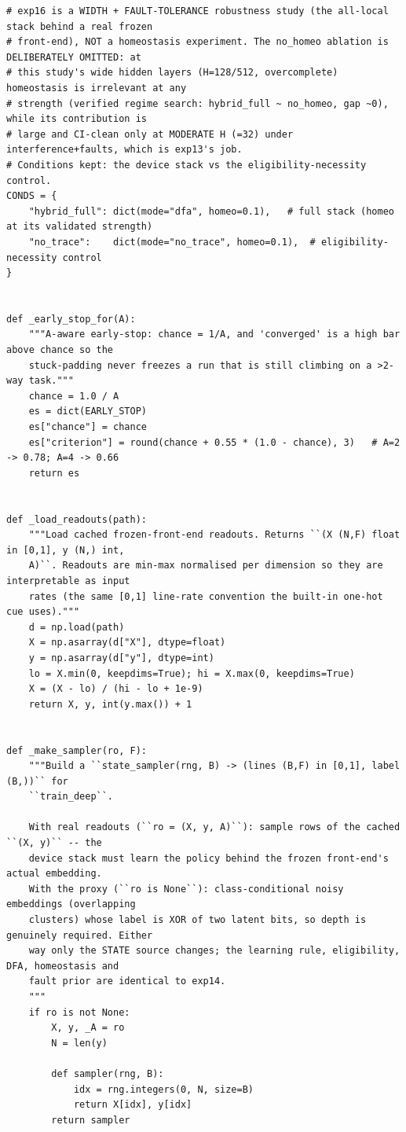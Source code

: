 \begin{lstlisting}[caption={mrl\_trace/hybrid.py},label={lst:siox-src-hybrid}]
# exp16 is a WIDTH + FAULT-TOLERANCE robustness study (the all-local stack behind a real frozen
# front-end), NOT a homeostasis experiment. The no_homeo ablation is DELIBERATELY OMITTED: at
# this study's wide hidden layers (H=128/512, overcomplete) homeostasis is irrelevant at any
# strength (verified regime search: hybrid_full ~ no_homeo, gap ~0), while its contribution is
# large and CI-clean only at MODERATE H (=32) under interference+faults, which is exp13's job.
# Conditions kept: the device stack vs the eligibility-necessity control.
CONDS = {
    "hybrid_full": dict(mode="dfa", homeo=0.1),   # full stack (homeo at its validated strength)
    "no_trace":    dict(mode="no_trace", homeo=0.1),  # eligibility-necessity control
}


def _early_stop_for(A):
    """A-aware early-stop: chance = 1/A, and 'converged' is a high bar above chance so the
    stuck-padding never freezes a run that is still climbing on a >2-way task."""
    chance = 1.0 / A
    es = dict(EARLY_STOP)
    es["chance"] = chance
    es["criterion"] = round(chance + 0.55 * (1.0 - chance), 3)   # A=2 -> 0.78; A=4 -> 0.66
    return es


def _load_readouts(path):
    """Load cached frozen-front-end readouts. Returns ``(X (N,F) float in [0,1], y (N,) int,
    A)``. Readouts are min-max normalised per dimension so they are interpretable as input
    rates (the same [0,1] line-rate convention the built-in one-hot cue uses)."""
    d = np.load(path)
    X = np.asarray(d["X"], dtype=float)
    y = np.asarray(d["y"], dtype=int)
    lo = X.min(0, keepdims=True); hi = X.max(0, keepdims=True)
    X = (X - lo) / (hi - lo + 1e-9)
    return X, y, int(y.max()) + 1


def _make_sampler(ro, F):
    """Build a ``state_sampler(rng, B) -> (lines (B,F) in [0,1], label (B,))`` for
    ``train_deep``.

    With real readouts (``ro = (X, y, A)``): sample rows of the cached ``(X, y)`` -- the
    device stack must learn the policy behind the frozen front-end's actual embedding.
    With the proxy (``ro is None``): class-conditional noisy embeddings (overlapping
    clusters) whose label is XOR of two latent bits, so depth is genuinely required. Either
    way only the STATE source changes; the learning rule, eligibility, DFA, homeostasis and
    fault prior are identical to exp14.
    """
    if ro is not None:
        X, y, _A = ro
        N = len(y)

        def sampler(rng, B):
            idx = rng.integers(0, N, size=B)
            return X[idx], y[idx]
        return sampler


\end{lstlisting}
